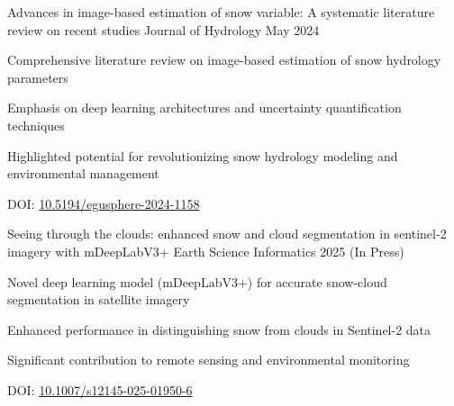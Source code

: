 
\begin{cventries}

  \cventry
    {Advances in image-based estimation of snow variable: A systematic literature review on recent studies} %
    {Journal of Hydrology} %
    {} %
    {May 2024} %
    {
      \begin{cvitems}
        \item {Comprehensive literature review on image-based estimation of snow hydrology parameters}
        \item {Emphasis on deep learning architectures and uncertainty quantification techniques}
        \item {Highlighted potential for revolutionizing snow hydrology modeling and environmental management}
        \item {DOI: \href{https://doi.org/10.5194/egusphere-2024-1158}{10.5194/egusphere-2024-1158}}
      \end{cvitems}
    }

  \cventry
    {Seeing through the clouds: enhanced snow and cloud segmentation in sentinel-2 imagery with mDeepLabV3+} %
    {Earth Science Informatics} %
    {} %
    {2025 (In Press)} %
    {
      \begin{cvitems}
        \item {Novel deep learning model (mDeepLabV3+) for accurate snow-cloud segmentation in satellite imagery}
        \item {Enhanced performance in distinguishing snow from clouds in Sentinel-2 data}
        \item {Significant contribution to remote sensing and environmental monitoring}
        \item {DOI: \href{https://doi.org/10.1007/s12145-025-01950-6}{10.1007/s12145-025-01950-6}}
      \end{cvitems}
    }

\end{cventries}